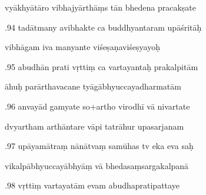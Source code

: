 \documentclass[article,12pt,a4paper]{memoir}%
\newcounter{parCount}
\begin{document}
	  
	  \pstart \leavevmode%
	vyākhyātāro vibhajyārthāṃs tān bhedena pracakṣate 
	{}
	\pend%
      

	  
	  \pstart {}.94 tadātmany avibhakte ca buddhyantaram upāśritāḥ 
	{}
	\pend%
      

	  
	  \pstart \leavevmode%
	vibhāgam iva manyante viśeṣaṇaviśeṣyayoḥ 
	{}
	\pend%
      

	  
	  \pstart {}.95 abudhān prati vṛttiṃ ca vartayantaḥ prakalpitām 
	{}
	\pend%
      

	  
	  \pstart \leavevmode%
	āhuḥ parārthavacane tyāgābhyuccayadharmatām 
	{}
	\pend%
      

	  
	  \pstart {}.96 anvayād gamyate so+artho virodhī vā nivartate 
	{}
	\pend%
      

	  
	  \pstart \leavevmode%
	dvyartham arthāntare vāpi tatrāhur upasarjanam 
	{}
	\pend%
      

	  
	  \pstart {}.97 upāyamātraṃ nānātvaṃ samūhas tv eka eva saḥ 
	{}
	\pend%
      

	  
	  \pstart \leavevmode%
	vikalpābhyuccayābhyāṃ vā bhedasaṃsargakalpanā 
	{}
	\pend%
      

	  
	  \pstart {}.98 vṛttiṃ vartayatām evam abudhapratipattaye 
	{}
	\pend%
      
\end{document}
